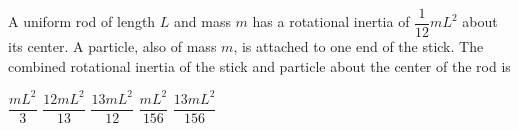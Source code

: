 \documentclass{../../oss-apphys-exam}
\begin{document}
\begin{multicols*}{2}
\begin{questions}
    
    \question A uniform rod of length $L$ and mass $m$ has a rotational inertia
    of $\dfrac1{12}mL^2$ about its center. A particle, also of mass $m$, is
    attached to one end of the stick. The combined rotational inertia of the
    stick and particle about the center of the rod is
    \begin{center}
    \end{center}
    \begin{choices}
      \choice$\dfrac{mL^2}3$
      \choice$\dfrac{12mL^2}{13}$
      \choice$\dfrac{13mL^2}{12}$
      \choice$\dfrac{mL^2}{156}$
      \choice$\dfrac{13mL^2}{156}$
    \end{choices}
    \columnbreak
    

\end{questions}
\end{multicols*}
\end{document}

